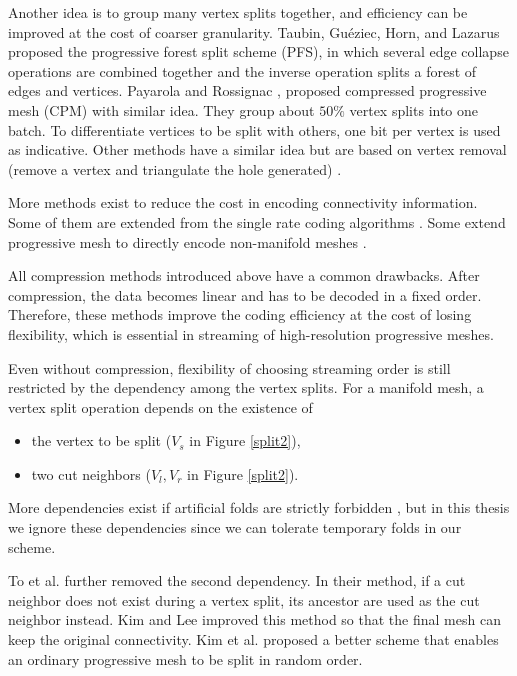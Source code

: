     Another idea is to group many vertex splits together, 
    and efficiency can be improved at the cost of coarser granularity. 
    Taubin, Gu\'{e}ziec, Horn, and Lazarus \cite{280834} proposed the
    progressive forest split scheme (PFS), in which several edge
    collapse operations are combined together and the inverse operation splits a
    forest of edges and vertices. 
    Payarola and Rossignac \cite{614450}, 
    proposed compressed progressive mesh (CPM)\label{cpm} with similar
    idea. They group about $50\%$ vertex splits into one batch. To
    differentiate vertices to be split with others, one bit per vertex
    is used as indicative. 
    Other methods have a similar idea
    but are based on vertex removal (remove a vertex and triangulate the hole
    generated) \cite{319358}. 

    More methods exist to reduce the cost in encoding connectivity information.
    Some of them are extended from the single rate coding algorithms
    \cite{319426, 383281}. Some extend progressive mesh to directly
    encode non-manifold meshes \cite{258852}.

    All compression methods introduced above 
    have a common drawbacks. After compression, the 
    data becomes linear and has to be decoded in a fixed order. 
    Therefore, these methods improve the coding efficiency at the cost
    of losing flexibility, which is essential in streaming of high-resolution
    progressive meshes.
    
    Even without compression, flexibility of choosing streaming order 
    is still restricted by the dependency among the vertex splits.
    For a manifold mesh, a vertex split operation depends on the existence of
    \begin{itemize}
        \item 
    the vertex to be split ($V_s$ in Figure \ref{split2}), 
        \item 
    two cut neighbors ($V_l, V_r$ in Figure \ref{split2}). 
    \end{itemize}
    More dependencies exist if artificial folds are strictly forbidden \cite{258843, 258847}, 
    but in this thesis we ignore these dependencies since we can 
    tolerate temporary folds in our scheme.
     
    To et al. \cite{To1999} further removed the second dependency.
    In their method, if a cut neighbor does not exist during a vertex split,
    its ancestor are used as the cut neighbor instead.
    Kim and Lee \cite{kim01truly} improved this method so that the final mesh
    can keep the original connectivity. 
    Kim et al. \cite{multiresolution:kim} proposed a better scheme that enables
    an ordinary progressive mesh to be split in random order.

